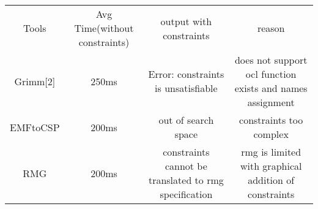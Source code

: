 \documentclass[12pt, letterpaper]{article}
\begin{document}
	\begin{tabular}{ |c|c|c|c| } 
		\hline
		Tools & Avg Time(without constraints) & output with constraints & reason \\ 
		Grimm[2] &250ms &Error: constraints is unsatisfiable  & does not support ocl function exists and names assignment \\ 
		EMFtoCSP & 200ms&out of search space & constraints too complex \\ 
		RMG & 200ms&constraints cannot be translated to rmg specification & rmg is limited with graphical addition of constraints \\
		\hline
	\end{tabular}
	
\end{document}
